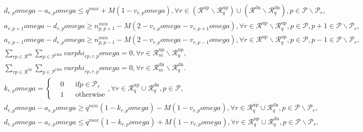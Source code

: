 \begin{align}
  &  d_{r , p} \mathit{omega} - a_{r , p} \mathit{omega} \leq q^{max} + M \left(1 - v_{r , p} \mathit{omega}\right) , \forall r \in \left(\mathcal{R}^{\text{up}} \backslash \mathcal{R}_{q}^{\text{up}}\right) \cup \left(\mathcal{R}^{\text{dn}} \backslash \mathcal{R}_{q}^{\text{dn}}\right) , p \in \mathcal{P} \backslash \mathcal{P}_{r} ,  \tag{eq\_0044} \\
  &  a_{r , p + 1} \mathit{omega} - d_{r , p} \mathit{omega} \geq n_{p , p + 1}^{min} - M \left(2 - v_{r , p} \mathit{omega} - v_{r , p + 1} \mathit{omega}\right) , \forall r \in \mathcal{R}^{\text{up}} \backslash \mathcal{R}_{q}^{\text{up}} , p \in \mathcal{P} , p + 1 \in \mathcal{P} \backslash \mathcal{P}_{r} ,  \tag{eq\_0045} \\
  &  a_{r , p - 1} \mathit{omega} - d_{r , p} \mathit{omega} \geq n_{p , p - 1}^{min} - M \left(2 - v_{r , p} \mathit{omega} - v_{r , p - 1} \mathit{omega}\right) , \forall r \in \mathcal{R}^{\text{up}} \backslash \mathcal{R}_{q}^{\text{up}} , p \in \mathcal{P} , p - 1 \in \mathcal{P} \backslash \mathcal{P}_{r} ,  \tag{eq\_0046} \\
  &  \underset{rp \in \mathcal{R}^{\text{dn}}}{\sum} \underset{p \in \mathcal{P}^{\text{turn}}}{\sum} \mathit{varphi}_{rp , r , p} \mathit{omega} = 0 , \forall r \in \mathcal{R}_{m}^{\text{up}} \backslash \mathcal{R}_{q}^{\text{up}} ,  \tag{eq\_0047} \\
  &  \underset{rp \in \mathcal{R}^{\text{up}}}{\sum} \underset{p \in \mathcal{P}^{\text{turn}}}{\sum} \mathit{varphi}_{rp , r , p} \mathit{omega} = 0 , \forall r \in \mathcal{R}_{m}^{\text{dn}} \backslash \mathcal{R}_{q}^{\text{dn}} .  \tag{eq\_0048} \\
  &  k_{r , p} \mathit{omega} = \begin{cases} & 0 & & \text{if} p \in \mathcal{P}_{r} \\ & 1 & & \text{otherwise} \end{cases} , \forall r \in \mathcal{R}_{q}^{\text{up}} \cup \mathcal{R}_{q}^{\text{dn}} , p \in \mathcal{P} ,  \tag{eq\_0049} \\
  &  d_{r , p} \mathit{omega} - a_{r , p} \mathit{omega} \geq q^{min} \left(1 - k_{r , p} \mathit{omega}\right) - M \left(1 - v_{r , p} \mathit{omega}\right) , \forall r \in \mathcal{R}_{q}^{\text{up}} \cup \mathcal{R}_{q}^{\text{dn}} , p \in \mathcal{P} \backslash \mathcal{P}_{r} ,  \tag{eq\_0050} \\
  &  d_{r , p} \mathit{omega} - a_{r , p} \mathit{omega} \leq q^{max} \left(1 - k_{r , p} \mathit{omega}\right) + M \left(1 - v_{r , p} \mathit{omega}\right) , \forall r \in \mathcal{R}_{q}^{\text{up}} \cup \mathcal{R}_{q}^{\text{dn}} , p \in \mathcal{P} \backslash \mathcal{P}_{r} ,  \tag{eq\_0051} \\

\end{align}
